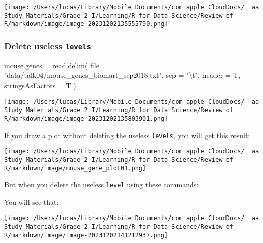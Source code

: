 \documentclass[
]{article}
\let\oldincludegraphics\includegraphics
\renewcommand{\includegraphics}[2][]{\begin{center}\oldincludegraphics[#1]{#2}\end{center}}
\newenvironment{Shaded}{}{}
\newcommand{\AttributeTok}[1]{\textcolor[rgb]{0.49,0.56,0.16}{#1}}
\newcommand{\FunctionTok}[1]{\textcolor[rgb]{0.02,0.16,0.49}{#1}}
\newcommand{\NormalTok}[1]{#1}
\newcommand{\OtherTok}[1]{\textcolor[rgb]{0.00,0.44,0.13}{#1}}
\newcommand{\SpecialCharTok}[1]{\textcolor[rgb]{0.25,0.44,0.63}{#1}}
\newcommand{\StringTok}[1]{\textcolor[rgb]{0.25,0.44,0.63}{#1}}
\begin{document}
\texttt{[image: /Users/lucas/Library/Mobile Documents/com~apple~CloudDocs/~~aa Study Materials/Grade 2 I/Learning/R for Data Science/Review of R/markdown/image/image-20231202135555790.png]}

\hypertarget{delete-useless-levels}{%
\subsubsection{\texorpdfstring{Delete useless
\texttt{levels}}{Delete useless levels}}\label{delete-useless-levels}}

\begin{Shaded}
\begin{Highlighting}[]
\NormalTok{mouse.genes }\OtherTok{=}
  \FunctionTok{read.delim}\NormalTok{(}
    \AttributeTok{file =} \StringTok{"data/talk04/mouse\_genes\_biomart\_sep2018.txt"}\NormalTok{,}
    \AttributeTok{sep =} \StringTok{"}\SpecialCharTok{\textbackslash{}t}\StringTok{"}\NormalTok{,}
    \AttributeTok{header =}\NormalTok{ T, }
    \AttributeTok{stringsAsFactors =}\NormalTok{ T }
\NormalTok{  )}
\end{Highlighting}
\end{Shaded}

\texttt{[image: /Users/lucas/Library/Mobile Documents/com~apple~CloudDocs/~~aa Study Materials/Grade 2 I/Learning/R for Data Science/Review of R/markdown/image/image-20231202135803901.png]}

If you draw a plot without deleting the useless \texttt{levels}, you
will get this result:

\texttt{[image: /Users/lucas/Library/Mobile Documents/com~apple~CloudDocs/~~aa Study Materials/Grade 2 I/Learning/R for Data Science/Review of R/markdown/image/mouse\_gene\_plot01.png]}

But when you delete the useless \texttt{level} using these commands:

\begin{Shaded}
\end{Shaded}

You will see that:

\texttt{[image: /Users/lucas/Library/Mobile Documents/com~apple~CloudDocs/~~aa Study Materials/Grade 2 I/Learning/R for Data Science/Review of R/markdown/image/image-20231202141212937.png]}
\end{document}
